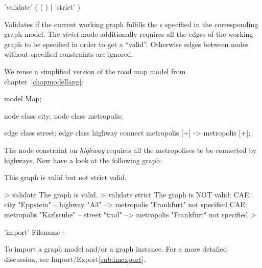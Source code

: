 \begin{rail}
  'validate' ( ( ) | 'strict' )
\end{rail}
Validates if the current working graph fulfills the s specified in the corresponding graph model. The \emph{strict} mode additionally requires all the edges of the working graph to be specified in order to get a ``valid''. Otherwise edges between nodes without specified constraints are ignored.\\
\begin{example}
We reuse a simplified version of the road map model from chapter~\ref{chapmodellang}:
\begin{grgen} 
model Map;

node class city;
node class metropolis;

edge class street;
edge class highway
      connect metropolis [+] -> metropolis [+];
\end{grgen}
The node constraint on \emph{highway} requires all the metropolises to be connected by highways. Now have a look at the following graph:
\begin{center}
\end{center}

This graph is valid but not strict valid.
\begin{grshell} 
> validate
The graph is valid.
> validate strict
The graph is NOT valid:
  CAE: city "Eppstein" -- highway "A3" --> metropolis "Frankfurt" not specified
  CAE: metropolis "Karlsruhe" -- street "trail" --> metropolis "Frankfurt" not specified
>
\end{grshell}
\end{example}

\begin{rail}
  'import' Filename+
\end{rail}
To import a graph model and/or a graph instance.
For a more detailed discussion, see Import/Export\ref{sub:imexport}.


